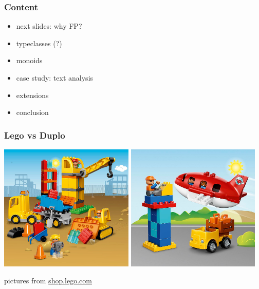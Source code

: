 \documentclass[aspectratio=169]{beamer}
\begin{document}
\begin{frame}
  \frametitle{Content}
  \begin{itemize}
  \item next slides: why FP?\@
  \item typeclasses (?)
  \item monoids
  \item case study: text analysis
  \item extensions
  \item conclusion
  \end{itemize}
\end{frame}

\begin{frame}[t]
  \frametitle{Lego vs Duplo}
  \begin{center}
    \includegraphics[width=0.48\textwidth]{static-images/duplo-construction.jpg}
    \hspace{1mm}
    \includegraphics[width=0.48\textwidth]{static-images/duplo-airport.jpg}
  \end{center}
  \vspace{3mm}
  \begin{center}
    {\tiny pictures from \url{shop.lego.com}}
  \end{center}
\end{frame}
\end{document}
